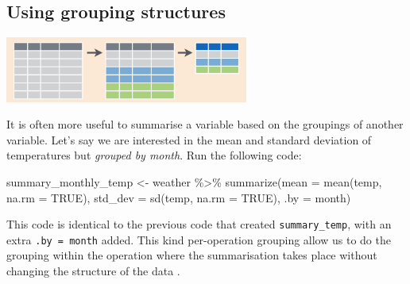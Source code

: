 \documentclass[
  letterpaper,
  DIV=11,
  numbers=noendperiod]{scrartcl}
\newenvironment{Shaded}{\begin{snugshade}}{\end{snugshade}}
\newcommand{\AttributeTok}[1]{\textcolor[rgb]{0.40,0.45,0.13}{#1}}
\newcommand{\ConstantTok}[1]{\textcolor[rgb]{0.56,0.35,0.01}{#1}}
\newcommand{\FunctionTok}[1]{\textcolor[rgb]{0.28,0.35,0.67}{#1}}
\newcommand{\NormalTok}[1]{\textcolor[rgb]{0.00,0.23,0.31}{#1}}
\newcommand{\OtherTok}[1]{\textcolor[rgb]{0.00,0.23,0.31}{#1}}
\newcommand{\SpecialCharTok}[1]{\textcolor[rgb]{0.37,0.37,0.37}{#1}}
\begin{document}
\subsection{Using grouping structures}\label{groupby}

\includegraphics[width=3.15in,height=\textheight]{group_summary.png}

It is often more useful to summarise a variable based on the groupings
of another variable. Let's say we are interested in the mean and
standard deviation of temperatures but \emph{grouped by month}. Run the
following code:

\begin{Shaded}
\begin{Highlighting}[]
\NormalTok{summary\_monthly\_temp }\OtherTok{\textless{}{-}}\NormalTok{ weather }\SpecialCharTok{\%\textgreater{}\%}
  \FunctionTok{summarize}\NormalTok{(}\AttributeTok{mean =} \FunctionTok{mean}\NormalTok{(temp, }\AttributeTok{na.rm =} \ConstantTok{TRUE}\NormalTok{),}
            \AttributeTok{std\_dev =} \FunctionTok{sd}\NormalTok{(temp, }\AttributeTok{na.rm =} \ConstantTok{TRUE}\NormalTok{),}
            \AttributeTok{.by =}\NormalTok{ month)}
\end{Highlighting}
\end{Shaded}

This code is identical to the previous code that created
\texttt{summary\_temp}, with an extra \texttt{.by\ =\ month} added. This
kind per-operation grouping allow us to do the grouping within the
operation where the summarisation takes place without changing the
structure of the data .
\end{document}
